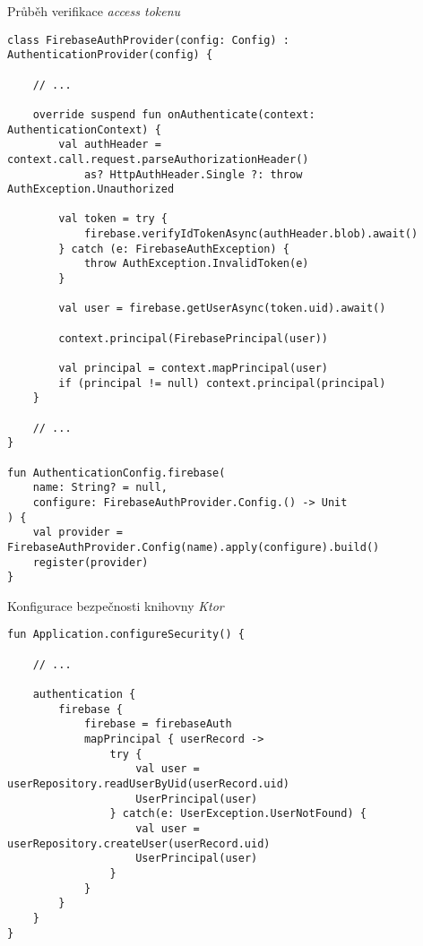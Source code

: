 \begin{listing}
\caption{Průběh verifikace \emph{access tokenu}}\label{code:access-token-verification}
\begin{verbatim}
class FirebaseAuthProvider(config: Config) : AuthenticationProvider(config) {

    // ...
    
    override suspend fun onAuthenticate(context: AuthenticationContext) {
        val authHeader = context.call.request.parseAuthorizationHeader() 
            as? HttpAuthHeader.Single ?: throw AuthException.Unauthorized

        val token = try {
            firebase.verifyIdTokenAsync(authHeader.blob).await()
        } catch (e: FirebaseAuthException) {
            throw AuthException.InvalidToken(e)
        }

        val user = firebase.getUserAsync(token.uid).await()

        context.principal(FirebasePrincipal(user))

        val principal = context.mapPrincipal(user)
        if (principal != null) context.principal(principal)
    }
    
    // ...
}

fun AuthenticationConfig.firebase(
    name: String? = null,
    configure: FirebaseAuthProvider.Config.() -> Unit
) {
    val provider = FirebaseAuthProvider.Config(name).apply(configure).build()
    register(provider)
}
\end{verbatim}
\end{listing}

\begin{listing}
\caption{Konfigurace bezpečnosti knihovny \emph{Ktor}}\label{code:ktor-security-config}
\begin{verbatim}
fun Application.configureSecurity() {
    
    // ...
    
    authentication {
        firebase {
            firebase = firebaseAuth
            mapPrincipal { userRecord ->
                try {
                    val user = userRepository.readUserByUid(userRecord.uid)
                    UserPrincipal(user)
                } catch(e: UserException.UserNotFound) {
                    val user = userRepository.createUser(userRecord.uid)
                    UserPrincipal(user)
                }
            }
        }
    }
}
\end{verbatim}
\end{listing}

